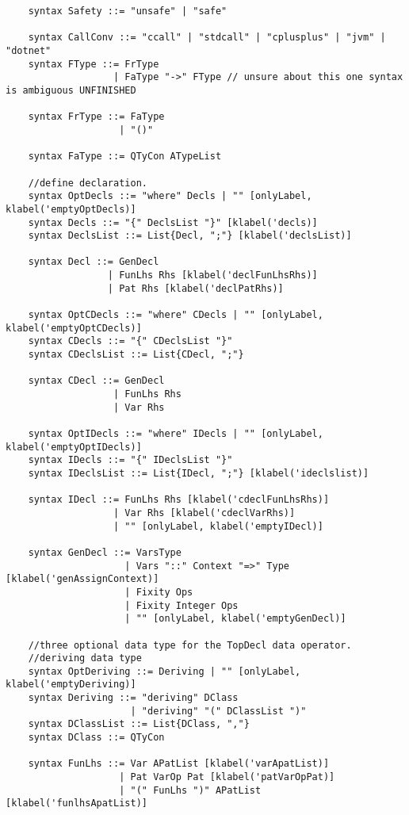 \begin{lstlisting}
    syntax Safety ::= "unsafe" | "safe"
                   
    syntax CallConv ::= "ccall" | "stdcall" | "cplusplus" | "jvm" | "dotnet"
    syntax FType ::= FrType
                   | FaType "->" FType // unsure about this one syntax is ambiguous UNFINISHED
    
    syntax FrType ::= FaType
                    | "()"
                    
    syntax FaType ::= QTyCon ATypeList

    //define declaration.
    syntax OptDecls ::= "where" Decls | "" [onlyLabel, klabel('emptyOptDecls)]
    syntax Decls ::= "{" DeclsList "}" [klabel('decls)]
    syntax DeclsList ::= List{Decl, ";"} [klabel('declsList)]

    syntax Decl ::= GenDecl
                  | FunLhs Rhs [klabel('declFunLhsRhs)]
                  | Pat Rhs [klabel('declPatRhs)]

    syntax OptCDecls ::= "where" CDecls | "" [onlyLabel, klabel('emptyOptCDecls)]
    syntax CDecls ::= "{" CDeclsList "}"
    syntax CDeclsList ::= List{CDecl, ";"}

    syntax CDecl ::= GenDecl
                   | FunLhs Rhs
                   | Var Rhs

    syntax OptIDecls ::= "where" IDecls | "" [onlyLabel, klabel('emptyOptIDecls)]
    syntax IDecls ::= "{" IDeclsList "}"
    syntax IDeclsList ::= List{IDecl, ";"} [klabel('ideclslist)]

    syntax IDecl ::= FunLhs Rhs [klabel('cdeclFunLhsRhs)]
                   | Var Rhs [klabel('cdeclVarRhs)]
                   | "" [onlyLabel, klabel('emptyIDecl)]

    syntax GenDecl ::= VarsType
                     | Vars "::" Context "=>" Type   [klabel('genAssignContext)]
                     | Fixity Ops
                     | Fixity Integer Ops
                     | "" [onlyLabel, klabel('emptyGenDecl)]

    //three optional data type for the TopDecl data operator. 
    //deriving data type
    syntax OptDeriving ::= Deriving | "" [onlyLabel, klabel('emptyDeriving)]
    syntax Deriving ::= "deriving" DClass
                      | "deriving" "(" DClassList ")"
    syntax DClassList ::= List{DClass, ","}
    syntax DClass ::= QTyCon

    syntax FunLhs ::= Var APatList [klabel('varApatList)]
                    | Pat VarOp Pat [klabel('patVarOpPat)]
                    | "(" FunLhs ")" APatList [klabel('funlhsApatList)]


\end{lstlisting}
